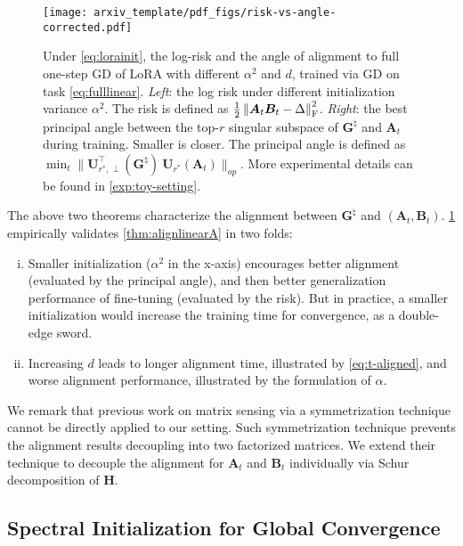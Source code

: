 \begin{figure}[t]
    \centering
    \texttt{[image: arxiv\_template/pdf\_figs/risk-vs-angle-corrected.pdf]}
    \caption{Under \eqref{eq:lorainit}, the log-risk and the angle of alignment to full one-step GD of LoRA with different $\alpha^2$ and $d$, trained via GD on task \eqref{eq:fulllinear}. \textit{Left}: the log risk under different initialization variance $\alpha^2$. The risk is defined as $\frac{1}{2}\left\|\bm A_t \bm B_t - \Delta\right\|^2_{\rm F}$. \textit{Right}: the best principal angle between the top-$r$ singular subspace of $\bm G^\natural$ and $\bm A_t$ during training. Smaller is closer. The principal angle is defined as $\min_{t}\|\bm U^{\!\top}_{r^*,\perp}( \bm G^{\natural})~\bm U_{r^*}\left(\bm A_{t}\right)\|_{op}$. More experimental details can be found in \cref{exp:toy-setting}.}
    \label{fig:small-init}\vspace{-0.2cm}
\end{figure}

The above two theorems characterize the alignment between $\bm G^{\natural}$ and $(\bm A_t, \bm B_t)$.
\cref{fig:small-init} empirically validates \cref{thm:alignlinearA} in two folds:
\begin{enumerate}[i)]
    \item Smaller initialization ($\alpha^2$ in the x-axis) encourages better alignment (evaluated by the principal angle), and then better generalization performance of fine-tuning (evaluated by the risk). But in practice, a smaller initialization would increase the training time for convergence, as a double-edge sword.
    \item Increasing $d$ leads to longer alignment time, illustrated by \cref{eq:t-aligned}, and worse alignment performance, illustrated by the formulation of $\alpha$. 
\end{enumerate}

We remark that previous work on matrix sensing \citep{stoger2021small,soltanolkotabi2023implicit} via a symmetrization technique cannot be directly applied to our setting. Such symmetrization technique prevents the alignment results decoupling into two factorized matrices. We extend their technique to decouple the alignment for $\bm A_t$ and $\bm B_t$ individually via Schur decomposition of $\bm H$.

\subsection{Spectral Initialization for Global Convergence}
\label{sec:linear-spectral}

